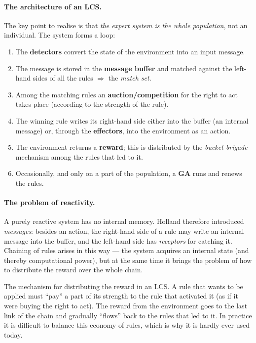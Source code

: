 \documentclass[11pt,a4paper]{article}
\theoremstyle{definition}
\providecommand{\uv}[1]{``#1''}
\begin{document}
\paragraph{The architecture of an LCS.} The key point to realise is that
\emph{the expert system is the whole population}, not an individual. The system
forms a loop:
\begin{enumerate}
\item The \textbf{detectors} convert the state of the environment into an input
  message.
\item The message is stored in the \textbf{message buffer} and matched against
  the left-hand sides of all the rules $\Rightarrow$ the \emph{match set}.
\item Among the matching rules an \textbf{auction/competition} for the right to
  act takes place (according to the strength of the rule).
\item The winning rule writes its right-hand side either into the buffer (an
  internal message) or, through the \textbf{effectors}, into the environment as
  an action.
\item The environment returns a \textbf{reward}; this is distributed by the
  \emph{bucket brigade} mechanism among the rules that led to it.
\item Occasionally, and only on a part of the population, a \textbf{GA} runs and
  renews the rules.
\end{enumerate}

\paragraph{The problem of reactivity.} A purely reactive system has no internal
memory. Holland therefore introduced \emph{messages}: besides an action, the
right-hand side of a rule may write an internal message into the buffer, and the
left-hand side has \emph{receptors} for catching it. Chaining of rules arises in
this way --- the system acquires an internal state (and thereby computational
power), but at the same time it brings the problem of how to distribute the
reward over the whole chain.

\begin{defbox}
The mechanism for distributing the reward in an LCS. A rule that wants to be
applied must \uv{pay} a part of its strength to the rule that activated it (as
if it were buying the right to act). The reward from the environment goes to the
last link of the chain and gradually \uv{flows} back to the rules that led to
it. In practice it is difficult to balance this economy of rules, which is why
it is hardly ever used today.
\end{defbox}
\end{document}
